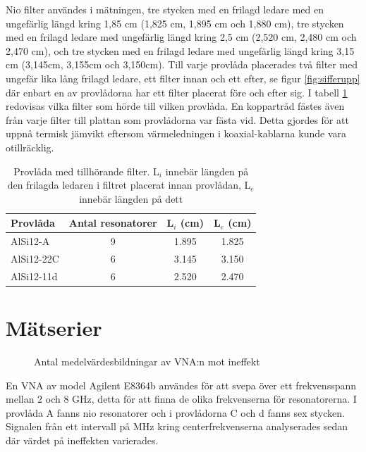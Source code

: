 \documentclass[main.tex]{subfiles}
\begin{document}
Nio filter användes i mätningen, tre stycken med en frilagd ledare med en ungefärlig längd kring 1,85 cm (1,825 cm, 1,895 cm och 1,880 cm), tre stycken med en frilagd ledare med ungefärlig längd kring 2,5 cm (2,520 cm, 2,480 cm och 2,470 cm), och tre stycken med en frilagd ledare med ungefärlig längd kring 3,15 cm (3,145cm, 3,155cm och 3,150cm). Till varje provlåda placerades två filter med ungefär lika lång frilagd ledare, ett filter innan och ett efter, se figur \ref{fig:sifferupp} där enbart en av provlådorna har ett filter placerat före och efter sig. I tabell \ref{tab:filtertillbox} redovisas vilka filter som hörde till vilken provlåda. En koppartråd fästes även från varje filter till plattan som provlådorna var fästa vid. Detta gjordes för att uppnå termisk jämvikt eftersom värmeledningen i koaxial-kablarna kunde vara otillräcklig. %

\begin{table}[h]
    \centering
        \caption{Provlåda med tillhörande filter. L$_i$ innebär längden på den frilagda ledaren i filtret placerat innan provlådan, L$_e$ innebär längden på dett}
    \label{tab:filtertillbox}
    \begin{tabular}{lccc}
    \toprule
        \textbf{Provlåda}  & Antal resonatorer & L$_i$ (cm) & L$_e$ (cm)\\
        \midrule
        AlSi12-A & 9 & 1.895 & 1.825\\
        AlSi12-22C & 6 & 3.145 & 3.150\\
        AlSi12-11d & 6 & 2.520 & 2.470\\
        \bottomrule
    \end{tabular}
\end{table}


\section{Mätserier}

\begin{figure}[h]
    \centering
    \setlength{}
    \setlength\figureheight{10em}
    
    \caption{Antal medelvärdesbildningar av VNA:n mot ineffekt}
    \label{fig:medel}
\end{figure}


En VNA av model Agilent E8364b användes för att svepa över ett frekvensspann mellan 2 och 8 GHz, detta för att finna de olika frekvenserna för resonatorerna. I provlåda A fanns nio resonatorer och i provlådorna C och d fanns sex stycken. Signalen från ett intervall på \unit[3]{MHz} kring centerfrekvenserna analyserades sedan där värdet på ineffekten varierades.
\end{document}
